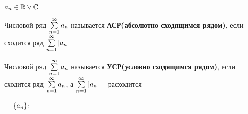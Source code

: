 
$a_n \in \mathbb{R} \vee \mathbb{C}$

\begin{defs}
	Числовой ряд $\sum\limits_{n=1}^{\infty}a_n$ называется \textbf{АСР(абсолютно сходящимся рядом)}, если сходится ряд $\sum\limits_{n=1}^{\infty}\left| a_n\right|$
\end{defs}

\begin{defs}
	Числовой ряд $\sum\limits_{n=1}^{\infty}a_n$ называется \textbf{УСР(условно сходящимся рядом)}, если сходится ряд $\sum\limits_{n=1}^{\infty}a_n$, а $\sum\limits_{n=1}^{\infty}\left| a_n\right|$ -- расходится
\end{defs}

\begin{proofs}
	$\sqsupset$ $\left\{ a_n\right\}$: %

\end{proofs}
